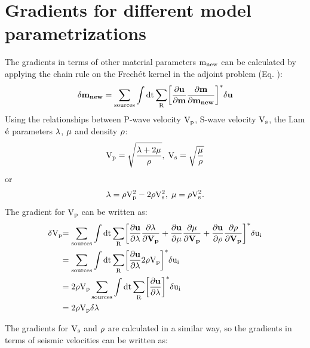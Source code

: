 \section{Gradients for different model parametrizations}
\label{model parametrizations}
The gradients in terms of other material parameters $\rm{m_{new}}$ can be calculated by applying the chain rule on the Frech$\rm{\acute{e}}$t kernel in the adjoint problem (Eq. ):
\begin{equation}
\rm{\delta \mathbf{m_{new}} = \sum_{sources} \int dt \sum_R \biggl[\frac{\partial \mathbf{u}}{\partial \mathbf{m}}\frac{\partial \mathbf{m}}{\partial \mathbf{m_{new}}}\biggr]^* \delta \mathbf{u}}
\label{2:50}
\end{equation}
Using the relationships between P-wave velocity $\rm{V_p}$, S-wave velocity $\rm{V_s}$, the Lam$\rm \acute{e}$ parameters $\rm{\lambda}$, $\rm{\mu}$ and density $\rm{\rho}$:
\begin{equation}
\rm{V_p = \sqrt{\frac{\lambda + 2 \mu}{\rho}},\; V_s = \sqrt{\frac{\mu}{\rho}}}
\label{2:51}
\end{equation}
or 
\begin{equation}
\rm{\lambda = \rho V_p^2 - 2 \rho V_s^2,\; \mu = \rho V_s^2.} 
\label{2:52}
\end{equation}
The gradient for $\rm{V_p}$ can be written as:
\begin{equation}
\begin{split}
\rm{\delta V_p} & \rm{= \sum_{sources} \int dt \sum_R \biggl[\frac{\partial \mathbf{u}}{\partial \mathbf{\lambda}}\frac{\partial \mathbf{\lambda}}{\partial \mathbf{V_p}} + \frac{\partial \mathbf{u}}{\partial \mathbf{\mu}}\frac{\partial \mathbf{\mu}}{\partial \mathbf{V_p}} + \frac{\partial \mathbf{u}}{\partial \mathbf{\rho}}\frac{\partial \mathbf{\rho}}{\partial \mathbf{V_p}} \biggr]^* \delta u_i} \\
 &\rm{= \sum_{sources} \int dt \sum_R \biggl[\frac{\partial \mathbf{u}}{\partial \mathbf{\lambda}} 2 \rho V_p \biggr]^* \delta u_i} \\
 &\rm{= 2 \rho V_p \sum_{sources} \int dt \sum_R \biggl[\frac{\partial \mathbf{u}}{\partial \mathbf{\lambda}}\biggr]^* \delta u_i} \\
 &\rm{= 2 \rho V_p \delta \lambda} 
\label{2:53}
\end{split}
\end{equation}

The gradients for $\rm{V_s}$ and $\rm{\rho}$ are calculated in a similar way, so the gradients in terms of seismic velocities can be written as:

